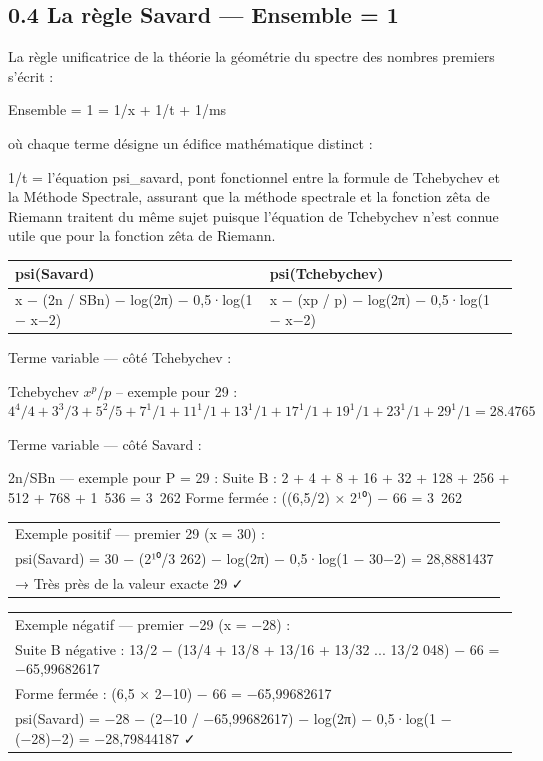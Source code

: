 \documentclass[11pt,a4paper]{article}
\begin{document}
\subsection{0.4 La règle Savard — Ensemble = 1}

La règle unificatrice de la théorie la géométrie du spectre des nombres premiers s'écrit :

Ensemble = 1 = 1/x + 1/t + 1/ms

où chaque terme désigne un édifice mathématique distinct :

1/t = l'équation psi\_savard, pont fonctionnel entre la formule de Tchebychev et la Méthode Spectrale, assurant que la méthode spectrale et la fonction zêta de Riemann traitent du même sujet puisque l'équation de Tchebychev n'est connue utile que pour la fonction zêta de Riemann.


\begin{longtable}{|p{}|p{}|}
\hline
psi(Savard) & psi(Tchebychev) \\
\hline
x − (2n / SBn) − log(2π) − 0,5·log(1 − x−2) & x − (xp / p) − log(2π) − 0,5·log(1 − x−2) \\
\hline
\end{longtable}


Terme variable — côté Tchebychev :

Tchebychev $x^p/p$ -- exemple pour 29 :
$4^4/4 + 3^3/3 + 5^2/5 + 7^1/1 + 11^1/1 + 13^1/1 + 17^1/1 + 19^1/1 + 23^1/1 + 29^1/1 = 28.4765$

Terme variable — côté Savard :

2n/SBn — exemple pour P = 29 :
Suite B : 2 + 4 + 8 + 16 + 32 + 128 + 256 + 512 + 768 + 1 536 = 3 262
Forme fermée : ((6,5/2) × 2¹⁰) − 66 = 3 262


\begin{longtable}{|p{}|}
\hline
Exemple positif — premier 29 (x = 30) : \\ psi(Savard) = 30 − (2¹⁰/3 262) − log(2π) − 0,5·log(1 − 30−2) = 28,8881437 \\ → Très près de la valeur exacte 29 ✓ \\
\hline
\end{longtable}



\begin{longtable}{|p{}|}
\hline
Exemple négatif — premier −29 (x = −28) : \\ Suite B négative : 13/2 − (13/4 + 13/8 + 13/16 + 13/32 ... 13/2 048) − 66 = −65,99682617 \\ Forme fermée : (6,5 × 2−10) − 66 = −65,99682617 \\ psi(Savard) = −28 − (2−10 / −65,99682617) − log(2π) − 0,5·log(1 − (−28)−2) = −28,79844187 ✓ \\
\hline
\end{longtable}
\end{document}
